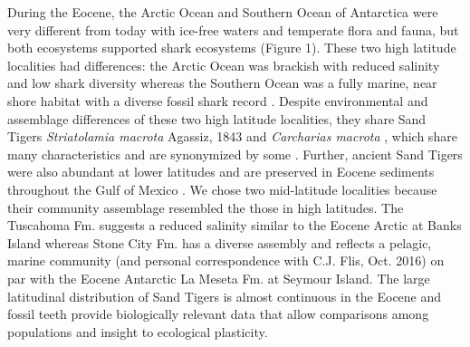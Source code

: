 \documentclass[]{rsos}%
\begin{document}
During the Eocene, the Arctic Ocean and Southern Ocean of Antarctica were very different from today with ice-free waters and temperate flora and fauna, but both ecosystems supported shark ecosystems \cite{Kriwet2005, Reguero2012, Padilla2014, Kriwet2016, Engelbrecht2019}(Figure 1).
These two high latitude localities had differences: the Arctic Ocean was brackish with reduced salinity \cite{Waddell2010,Kim2014} and low shark diversity \cite{Greenwood2010,Padilla2014} whereas the Southern Ocean was a fully marine, near shore habitat \cite{Ivany2008} with a diverse fossil shark record \cite{Long1992,Kriwet2016}.
Despite environmental and assemblage differences of these two high latitude localities, they share Sand Tigers \emph{Striatolamia macrota} Agassiz, 1843 and \emph{Carcharias macrota} \cite{Kriwet2005, Reguero2012, Padilla2014, Kriwet2016, Engelbrecht2019}, which share many characteristics and are synonymized by some \cite{purdy1998chondrichthyan}.
Further, ancient Sand Tigers were also abundant at lower latitudes and are preserved in Eocene sediments throughout the Gulf of Mexico \cite{Westgate}.
We chose two mid-latitude localities because their community assemblage resembled the those in high latitudes.
The Tuscahoma Fm. suggests a reduced salinity \cite{ingram1991tuscahoma, Beard2009} similar to the Eocene Arctic at Banks Island whereas Stone City Fm. has a diverse assembly and reflects a pelagic, marine community \cite{Breard1999, Westgate, harding2014mineralogy} (and personal correspondence with C.J. Flis, Oct. 2016) on par with the Eocene Antarctic La Meseta Fm. at Seymour Island. 
 The large latitudinal distribution of Sand Tigers is almost continuous in the Eocene and fossil teeth provide biologically relevant data that allow comparisons among populations and insight to ecological plasticity.
\end{document}
